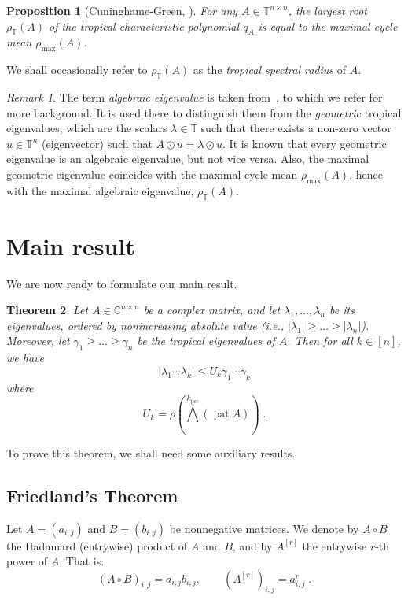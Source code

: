 \documentclass[a4paper]{amsart}
\theoremstyle{definition}
\theoremstyle{plain}
\newtheorem{thm}{Theorem}
\newtheorem{prop}[thm]{Proposition}
\theoremstyle{remark}
\newtheorem*{rmk*}{Remark}
\begin{document}
\begin{prop}[Cuninghame-Green, \cite{cuninghame83}]\label{rhoTequal}
 For any $A \in {{\mathbb{T}}}^{n \times n}$, the largest root $\rho_{{\mathbb{T}}} (A)$
of the tropical
 characteristic polynomial $q_A$ is equal to the maximal cycle mean $\rho_{\max} (A)$.
\end{prop}
We shall occasionally refer to  $\rho_{{\mathbb{T}}} (A)$
as the \emph{tropical spectral radius} of $A$.
\begin{rmk*}
The term {\em algebraic eigenvalue}
is taken from~\cite{abg05}, to which we refer
for more background. It is used there
to distinguish them from the \emph{geometric} tropical eigenvalues,
which are 
the scalars $\lambda \in {{\mathbb{T}}}$
such that there exists a non-zero vector $u \in {{\mathbb{T}}}^n$ (eigenvector)
such that
 $A \odot u = \lambda \odot u$. It is known that every 
geometric eigenvalue is an algebraic eigenvalue,
but not vice versa. Also, the maximal geometric eigenvalue
coincides with the maximal cycle mean $\rho_{\max} (A)$,
hence with the maximal algebraic eigenvalue, $\rho_{{\mathbb{T}}}(A)$.
\end{rmk*}

\section{Main result}\label{sec-main}

We are now ready to formulate our main result.

\begin{thm}
\label{upper_bound}
Let $A \in {\mathbb{C}}^{n \times n}$ be a complex matrix, and let $\lambda_1,\dots,\lambda_n$ be its eigenvalues,
ordered by nonincreasing absolute value (i.e., $|\lambda_1| {\geqslant} \dots {\geqslant} |\lambda_n|$).
Moreover, let $\gamma_1 {\geqslant} \dots {\geqslant} \gamma_n$ be the tropical eigenvalues of $A$.
Then for all $k \in [n]$, we have
\[
 |\lambda_1 \dotsm \lambda_k| {\leqslant} U_k \gamma_1 \dotsm \gamma_k
\]
where
\[
 U_k = \rho({\mbox{$\bigwedge$}}^k_\operatorname{per} (\operatorname{pat} A)) \;  .
\]
\end{thm}

To prove this theorem, we shall need some auxiliary results.

\subsection{Friedland's Theorem}
Let $A = \left( a_{i,j} \right)$ and $B = \left( b_{i,j} \right)$ be nonnegative matrices.
We denote by $A \circ B$ the Hadamard (entrywise) product of $A$ and $B$,
and by $A^{[r]}$ the entrywise $r$-th power of $A$. That is:
\[
 {(A\circ B)}_{i,j} = a_{i,j} b_{i,j}, \qquad {(A^{[r]})}_{i,j} = a_{i,j}^r \;  .
\]
\end{document}
